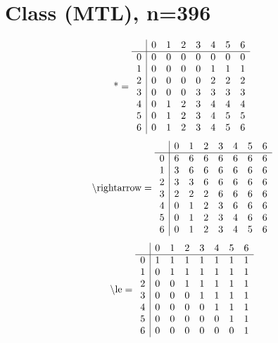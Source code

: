 \documentclass[11pt]{article}
\begin{document}
\section{Class (MTL), n=396}
\[\text{*} = 
\begin{array}{r | r r r r r r r}
 & 0 & 1 & 2 & 3 & 4 & 5 & 6 \\ \hline
0 & 0 & 0 & 0 & 0 & 0 & 0 & 0 \\
1 & 0 & 0 & 0 & 0 & 1 & 1 & 1 \\
2 & 0 & 0 & 0 & 0 & 2 & 2 & 2 \\
3 & 0 & 0 & 0 & 3 & 3 & 3 & 3 \\
4 & 0 & 1 & 2 & 3 & 4 & 4 & 4 \\
5 & 0 & 1 & 2 & 3 & 4 & 5 & 5 \\
6 & 0 & 1 & 2 & 3 & 4 & 5 & 6 \\
\end{array}
\]
\[\text{\textbackslash rightarrow} = 
\begin{array}{r | r r r r r r r}
 & 0 & 1 & 2 & 3 & 4 & 5 & 6 \\ \hline
0 & 6 & 6 & 6 & 6 & 6 & 6 & 6 \\
1 & 3 & 6 & 6 & 6 & 6 & 6 & 6 \\
2 & 3 & 3 & 6 & 6 & 6 & 6 & 6 \\
3 & 2 & 2 & 2 & 6 & 6 & 6 & 6 \\
4 & 0 & 1 & 2 & 3 & 6 & 6 & 6 \\
5 & 0 & 1 & 2 & 3 & 4 & 6 & 6 \\
6 & 0 & 1 & 2 & 3 & 4 & 5 & 6 \\
\end{array}
\]
\[\text{\textbackslash le} = 
\begin{array}{r | r r r r r r r}
 & 0 & 1 & 2 & 3 & 4 & 5 & 6 \\ \hline
0 & 1 & 1 & 1 & 1 & 1 & 1 & 1 \\
1 & 0 & 1 & 1 & 1 & 1 & 1 & 1 \\
2 & 0 & 0 & 1 & 1 & 1 & 1 & 1 \\
3 & 0 & 0 & 0 & 1 & 1 & 1 & 1 \\
4 & 0 & 0 & 0 & 0 & 1 & 1 & 1 \\
5 & 0 & 0 & 0 & 0 & 0 & 1 & 1 \\
6 & 0 & 0 & 0 & 0 & 0 & 0 & 1 \\
\end{array}
\]
\end{document}
